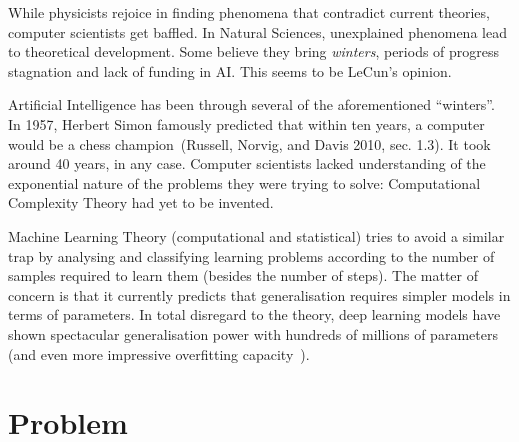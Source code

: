 \documentclass[
  letterpaper,
  12pt,
  british]{tufte-book}
\theoremstyle{plain}
\theoremstyle{plain}
\theoremstyle{definition}
\theoremstyle{remark}
\begin{document}
While physicists rejoice in finding phenomena that contradict current
theories, computer scientists get baffled. In Natural Sciences,
unexplained phenomena lead to theoretical development. Some believe they
bring \emph{winters}, periods of progress stagnation and lack of funding
in {AI}. This seems to be LeCun's opinion.

Artificial Intelligence has been through several of the aforementioned
``winters''. In 1957, Herbert Simon famously predicted that within ten years, a computer would be a
chess champion~(Russell, Norvig, and Davis 2010, sec.
1.3).
It took around 40 years, in any case. Computer scientists lacked
understanding of the exponential nature of the problems they were trying
to solve: Computational Complexity Theory had yet to be invented.

Machine Learning Theory (computational and statistical) tries to avoid a
similar trap by analysing and classifying learning problems according to
the number of samples required to learn them (besides the number of
steps). The matter of concern is that it currently predicts that
generalisation requires simpler models in terms of parameters. In total
disregard to the theory, deep learning models have shown spectacular
generalisation power with hundreds of millions of parameters (and even
more impressive overfitting capacity~).

\hypertarget{problem}{%
\section{Problem}\label{problem}}
\end{document}
